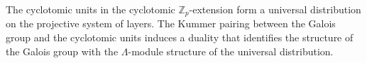 The cyclotomic units in the cyclotomic $\mathbb{Z}_p$-extension form a universal distribution on the projective system of layers. The Kummer pairing between the Galois group and the cyclotomic units induces a duality that identifies the structure of the Galois group with the $\Lambda$-module structure of the universal distribution.
